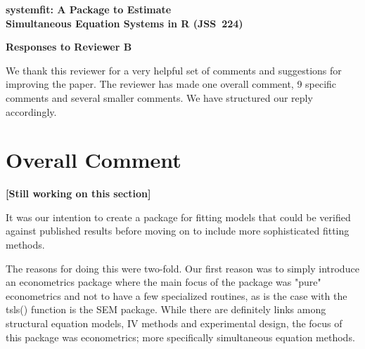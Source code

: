 \documentclass[12pt,english]{scrartcl}
\begin{document}
\begin{center}
{\Large\textbf{\textsf{
systemfit: A Package to Estimate\\[0.3em]
Simultaneous Equation Systems in R (JSS~224)}}}

\bigskip

{\Large\textbf{\textsf{Responses to Reviewer B}}}
\end{center}


We thank this reviewer for a very helpful set of comments and suggestions
for improving the paper.
The reviewer has made one overall comment, 9 specific comments and
several smaller comments.
We have structured our reply accordingly.

\section{Overall Comment}

\textbf{[Still working on this section]}

It was our intention to create a package for fitting models that could
be verified against published results before moving on to include more
sophisticated fitting methods. 

The reasons for doing this were two-fold.  Our first reason was to
simply introduce an econometrics package where the main focus of the
package was "pure" econometrics and not to have a few specialized
routines, as is the case with the tsls() function is the SEM
package. While there are definitely links among structural equation
models, IV methods and experimental design, the focus of this package
was econometrics; more specifically simultaneous equation methods.   
\end{document}
